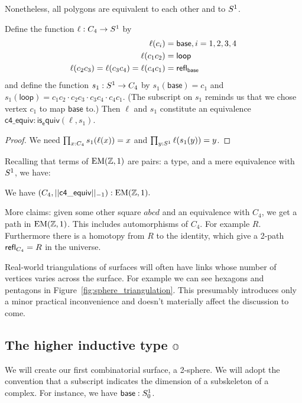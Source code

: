 Nonetheless, all polygons are equivalent to each other and to \( S^1 \).

\begin{mylemma}
\label{lem:c4equiv}
Define the function \( \ell:C_4\to S^1 \) by
\begin{align*}
\ell(c_i)&=\mathsf{base}, i=1, 2, 3, 4 \\
\ell(c_1c_2)&=\mathsf{loop} \\
\ell(c_2c_3)=\ell(c_3c_4)=\ell(c_4c_1)&=\mathsf{refl}_{\mathsf{base}}
\end{align*}
and define the function \( s_1:S^1\to C_4 \) by \( s_1(\mathsf{base})=c_1 \) and \( s_1(\mathsf{loop})=c_1c_2\cdot c_2c_3\cdot c_3c_4\cdot c_4c_1 \). (The subscript on \( s_1 \) reminds us that we chose vertex \( c_1 \) to map \( \mathsf{base} \) to.) Then \( \ell \) and \( s_1 \) constitute an equivalence \( \mathsf{c4\_equiv}:\mathsf{is_equiv}(\ell,s_1) \).
\end{mylemma}
\begin{proof}
We need \( \prod_{x:C_4}s_1(\ell(x))=x \) and \( \prod_{y:S^1}\ell(s_1(y))=y \).
\end{proof}

Recalling that terms of \( \mathrm{EM}(\mathbb{Z},1) \) are pairs: a type, and a mere equivalence with \( S^1 \), we have:

\begin{mycor}
We have \( (C_4,||\mathsf{c4\_equiv}||_{-1}):\mathrm{EM}(\mathbb{Z},1). \)
\end{mycor}

More claims: given some other square \( abcd \) and an equivalence with \( C_4 \), we get a path in \( \mathrm{EM}(\mathbb{Z},1) \). This includes automorphisms of \( C_4 \). For example \( R \). Furthermore there is a homotopy from \( R \) to the identity, which give a 2-path \( \mathsf{refl}_{C_4}=R \) in the universe.

Real-world triangulations of surfaces will often have links whose number of vertices varies across the surface. For example we can see hexagons and pentagons in Figure~\ref{fig:sphere_triangulation}. This presumably introduces only a minor practical inconvenience and doesn't materially affect the discussion to come.

\subsection{\texorpdfstring{The higher inductive type \( \mathbb{O} \)}{The higher inductive type O}}

We will create our first combinatorial surface, a 2-sphere. We will adopt the convention that a subscript indicates the dimension of a subskeleton of a complex. For instance, we have \( \mathsf{base}:S^1_0 \).

